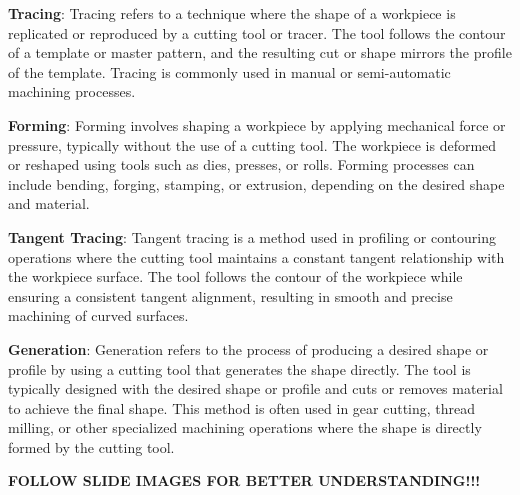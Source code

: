 \documentclass{article}
\begin{document}
\textbf{Tracing}: Tracing refers to a technique where the shape of a workpiece is replicated or reproduced by a cutting tool or tracer. The tool follows the contour of a template or master pattern, and the resulting cut or shape mirrors the profile of the template. Tracing is commonly used in manual or semi-automatic machining processes.

\textbf{Forming}: Forming involves shaping a workpiece by applying mechanical force or pressure, typically without the use of a cutting tool. The workpiece is deformed or reshaped using tools such as dies, presses, or rolls. Forming processes can include bending, forging, stamping, or extrusion, depending on the desired shape and material.

\textbf{Tangent Tracing}: Tangent tracing is a method used in profiling or contouring operations where the cutting tool maintains a constant tangent relationship with the workpiece surface. The tool follows the contour of the workpiece while ensuring a consistent tangent alignment, resulting in smooth and precise machining of curved surfaces.

\textbf{Generation}: Generation refers to the process of producing a desired shape or profile by using a cutting tool that generates the shape directly. The tool is typically designed with the desired shape or profile and cuts or removes material to achieve the final shape. This method is often used in gear cutting, thread milling, or other specialized machining operations where the shape is directly formed by the cutting tool.

\vspace*{1cm}
\textbf{FOLLOW SLIDE IMAGES FOR BETTER UNDERSTANDING!!!} 
\hrulefill
\end{document}
